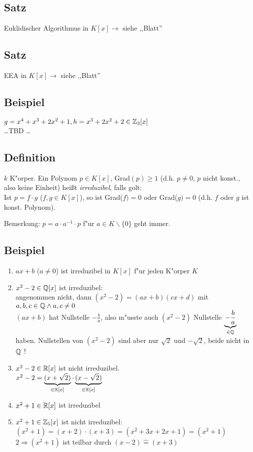\subsection{Satz} Euklidischer Algorithmus in $K[x] \rightarrow$ siehe ,,Blatt''
\subsection{Satz} EEA in $K[x] \rightarrow$ siehe ,,Blatt''

\subsection{Beispiel}
$g=x^4+x^3 + 2x^2+1,  h= x^3+2x^2+2 \in \mathbb{Z}_3 [x]$\\
\dots TBD \dots

\subsection{Definition}
$k$ K"orper. Ein Polynom $p\in K[x]$, Grad$(p)\geq 1$ (d.h. $p\neq 0$, $p$ nicht konst., also keine Einheit) heißt \emph{irreduzibel}, falls golt: \\
Ist $p=f \cdot g$ ($f,g\in K[x]$), so ist Grad($f)= 0$ oder Grad($g)=0$ (d.h. $f$ oder $g$ ist konst. Polynom).

Bemerkung: $p= a \cdot a^{-1} \cdot p$ f"ur $a \in K \backslash \{0\}$ geht immer.
\subsection{Beispiel}
\begin{enumerate}
	\item
	$ax+b$ ($a \neq 0$) ist irreduzibel in $K[x]$ f"ur jeden K"orper $K$
	\item
	$x^2-2 \in \mathbb{Q}[x]$ ist irreduzibel:\\
	angenommen nicht, dann $(x^2-2) = (ax+b)(cx+d)$ mit $a,b,c \in \mathbb{Q} \land a,c \neq 0$\\
	$(ax+b)$ hat Nullstelle $-\frac{b}{a}$, also m"usste auch $(x^2-2)$ Nullstelle $\underbrace{-\frac{b}{a}}_{\in \mathbb{Q}}$ haben.
	Nullstellen von $(x^2-2)$ sind aber nur $\sqrt{2}$ und $-\sqrt{2}$, beide nicht in $\mathbb{Q}$ !
	\item
	$x^2-2 \in \mathbb{R}[x]$ ist nicht irreduzibel.\\
	$x^2-2 = \underbrace{(x+ \sqrt{2})}_{\in \mathbb{R}[x]} \cdot \underbrace{(x-\sqrt{2})}_{\in \mathbb{R}[x]}$
	\item
	$x^2+1 \in \mathbb{R}[x]$ ist irreduzibel
	\item
	$x^2+1 \in \mathbb{Z}_5[x]$ ist nicht irreduzibel:\\
	$(x^2 +1) = (x+2) \cdot (x+3) = (x^2 + 3x +2x +1) = (x^2+1)$\\
	$2 \Rightarrow (x^2+1)$ ist teilbar durch $(x-2) \hat{=} (x+3)$
\end{enumerate}

